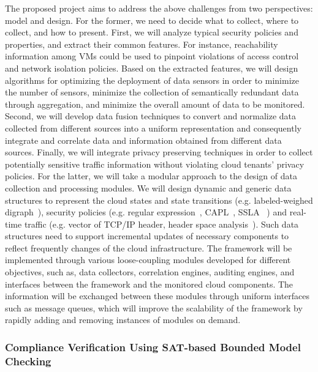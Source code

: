 \documentclass[12pt]{article}
\begin{document}
The proposed project aims to address the above challenges from two
perspectives: model and design. For the former, we need to decide what
to collect, where to collect, and how to present. First, we will
analyze typical security policies and properties, and extract their
common features. For instance, reachability information among VMs
could be used to pinpoint violations of access control and network
isolation policies. Based on the extracted features, we will design
algorithms for optimizing the deployment of data sensors in order to
minimize the number of sensors, minimize the collection of
semantically redundant data through aggregation, and minimize the
overall amount of data to be monitored. Second, we will develop data
fusion techniques to convert and normalize data collected from
different sources into a uniform representation and consequently
integrate and correlate data and information obtained from different
data sources. Finally, we will integrate privacy preserving techniques
in order to collect potentially sensitive traffic information without
violating cloud tenants' privacy policies. For the latter, we will
take a modular approach to the design of data collection and
processing modules. We will design dynamic and generic data structures
to represent the cloud states and state transitions
(e.g. labeled-weighed
digraph~\cite{Kazemian:2013:RTN:2482626.2482638}), security policies
(e.g. regular expression~\cite{Kazemian:2013:RTN:2482626.2482638},
CAPL~\cite{6753796}, SSLA~\cite{6274008} ) and real-time traffic
(e.g. vector of TCP/IP header, header space
analysis~\cite{Kazemian:2013:RTN:2482626.2482638}). Such data
structures need to support incremental updates of necessary components
to reflect frequently changes of the cloud infrastructure. The
framework will be implemented through various loose-coupling modules
developed for different objectives, such as, data collectors,
correlation engines, auditing engines, and interfaces between the
framework and the monitored cloud components. The information will be
exchanged between these modules through uniform interfaces such as
message queues, which will improve the scalability of the framework by
rapidly adding and removing instances of modules on demand.



\vspace{-3mm}

\subsubsection{Compliance Verification Using SAT-based Bounded Model Checking}
\label{subsec:BMC}
\vspace{-2mm}
\end{document}
